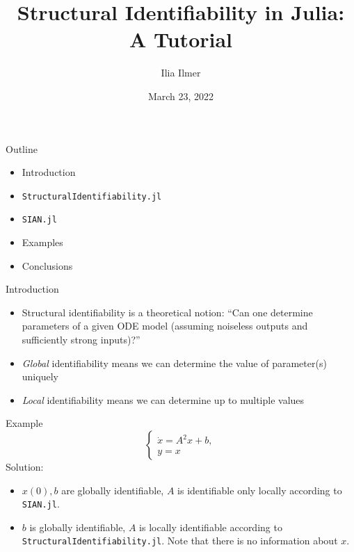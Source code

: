 \documentclass[12pt, aspectratio=169]{beamer}
\title{Structural Identifiability in Julia: A Tutorial}
\institute{\inst{1}Graduate Center, CUNY}
\author[Ilia Ilmer]{Ilia Ilmer\inst{1}}
\date{March 23, 2022}
\begin{document}
\maketitle
\begin{frame}{Outline}
    \begin{itemize}
        \item Introduction
        \item {\tt StructuralIdentifiability.jl}
        \item {\tt SIAN.jl}
        \item Examples
        \item Conclusions
    \end{itemize}
\end{frame}
\begin{frame}{Introduction}
    \begin{itemize}
        \item Structural identifiability is a theoretical notion\pause{}: ``Can one determine parameters of a given ODE model (assuming noiseless outputs and sufficiently strong inputs)?''\pause{}
        \item {\it Global} identifiability means we can determine the value of parameter(s) uniquely\pause{}
        \item {\it Local} identifiability means we can determine up to multiple values
    \end{itemize}
\end{frame}
\begin{frame}{Example}
    \begin{equation}
        \begin{cases}
            \dot{x} = A^2x + b, \\
            y = x
        \end{cases}
    \end{equation}
    \pause{}
    Solution: \begin{itemize}
        \item \(x(0), b\) are globally identifiable, \(A\) is identifiable only locally according to {\tt SIAN.jl}.\pause{}
        \item \(b\) is globally identifiable, \(A\) is locally identifiable according to {\tt StructuralIdentifiability.jl}. Note that there is no information about \(x\).
    \end{itemize}

\end{frame}
\end{document}

